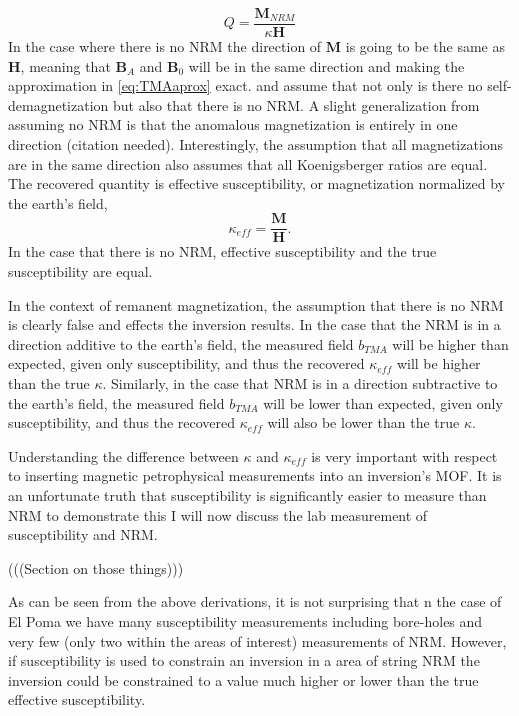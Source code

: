 \begin{equation} \label{eq:Koenigsberger}
Q = \frac{\textbf{M}_{NRM}}{ \kappa\textbf{H}}
\end{equation}
In the case where there is no \ac{NRM} the direction of $\mathbf M$ is going to be the same as $\mathbf H$, meaning that $\mathbf B_A$ and $\mathbf B_0$ will be in the same direction and making the approximation in \autoref{eq:TMAaprox} exact. \cite{li19963} and \cite{pilkington19973} assume that not only is there no self-demagnetization but also that there is no \ac{NRM}. A slight generalization from assuming no \ac{NRM} is that the anomalous magnetization is entirely in one direction (citation needed). Interestingly, the assumption that all magnetizations are in the same direction also assumes that all Koenigsberger ratios are equal. The recovered quantity is effective susceptibility, or magnetization normalized by the earth's field,
\begin{equation} \label{eq:effSusc}
\kappa_{eff} =  \frac{\textbf{M}}{\textbf{H}}.
\end{equation}In the case that there is no \ac{NRM}, effective susceptibility and the true susceptibility are equal.

	In the context of remanent magnetization, the assumption that there is no \ac{NRM} is clearly false and effects the inversion results. In the case that the \ac{NRM} is in a direction additive to the earth's field, the measured field $b_{TMA}$ will be higher than expected, given only susceptibility, and thus the recovered $\kappa_{eff}$ will be higher than the true $\kappa$. Similarly, in the case that \ac{NRM} is in a direction subtractive to the earth's field, the measured field $b_{TMA}$ will be lower than expected, given only susceptibility, and thus the recovered $\kappa_{eff}$ will also be lower than the true $\kappa$.
	
	Understanding the difference between $\kappa$ and $\kappa_{eff}$ is very important with respect to inserting magnetic petrophysical measurements into an inversion's \ac{MOF}. It is an unfortunate truth that susceptibility is significantly easier to measure than \ac{NRM} to demonstrate this I will now discuss the lab measurement of susceptibility and \ac{NRM}.
	
(((Section on those things)))

As can be seen from the above derivations, it is not surprising that n the case of El Poma we have many susceptibility measurements including bore-holes and very few (only two within the areas of interest) measurements of \ac{NRM}. However, if susceptibility is used to constrain an inversion in a area of string \ac{NRM} the inversion could be constrained to a value much higher or lower than the true effective susceptibility. 
	

